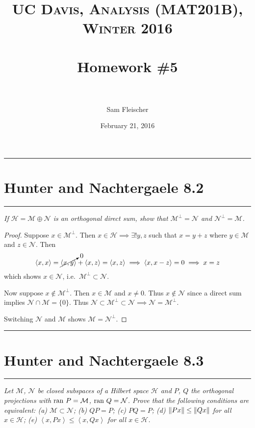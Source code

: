 \documentclass{article} %
\title{ 
\normalfont \normalsize 
\textsc{UC Davis, Analysis (MAT201B), Winter 2016} \\ [25pt] %
\horrule{2pt} \\[0.4cm] %
\Huge Homework \#5 \\ %
\horrule{2pt} \\[0.5cm] %
}
\author{\huge Sam Fleischer} %
\date{February 21, 2016} %
\theoremstyle{plain}
\newcommand{\VEC}[2]{\left\langle #1, #2 \right\rangle}
\newcommand{\ran}{\text{\rm ran }}
\newcommand{\problem}[1]{
\vspace{.375cm}
\begin{minipage}{\textwidth}
    \begin{center}
        \noindent\rule{5cm}{1pt}
    \end{center}
    \section{\bf #1}
    \begin{center}
        \noindent\rule{5cm}{1pt}
    \end{center}
    \vspace{0.25cm}
\end{minipage}
}
\numberwithin{equation}{section} %
\numberwithin{figure}{section} %
\numberwithin{table}{section} %
\begin{document}
\thispagestyle{empty}

\maketitle %

\makeatletter
{}
\makeatother

\pagebreak

\problem{Hunter and Nachtergaele 8.2}
\emph{If $\mathcal{H} = \mathcal{M} \oplus \mathcal{N}$ is an orthogonal direct sum, show that $\mathcal{M}^\perp = \mathcal{N}$ and $\mathcal{N}^\perp = \mathcal{M}$.}

\begin{proof}
    Suppose $x \in \mathcal{M}^\perp$.  Then $x \in \mathcal{H} \implies \exists!y, z$ such that $x = y + z$ where $y \in \mathcal{M}$ and $z \in \mathcal{N}$.  Then
    \begin{align*}
        \VEC{x}{x} = \cancelto{0}{\VEC{x}{y}} + \VEC{x}{z} = \VEC{x}{z} \implies \VEC{x}{x-z} = 0 \implies x = z
    \end{align*}
    which shows $x \in \mathcal{N}$, i.e.~$\mathcal{M}^\perp \subset \mathcal{N}$.

    Now suppose $x \not\in \mathcal{M}^\perp$.  Then $x \in \mathcal{M}$ and $x \neq 0$.  Thus $x \not\in \mathcal{N}$ since a direct sum implies $\mathcal{N} \cap \mathcal{M} = \{0\}$.  Thus $\mathcal{N} \subset \mathcal{M}^\perp \subset \mathcal{N} \implies \mathcal{N} = \mathcal{M}^\perp$.

    Switching $\mathcal{N}$ and $\mathcal{M}$ shows $\mathcal{M} = \mathcal{N}^\perp$.
\end{proof}









\problem{Hunter and Nachtergaele 8.3}
\emph{Let $\mathcal{M}$, $\mathcal{N}$ be closed subspaces of a Hilbert space $\mathcal{H}$ and $P$, $Q$ the orthogonal projections with $\ran P = \mathcal{M}$, $\ran Q = \mathcal{N}$.  Prove that the following conditions are equivalent: (a) $\mathcal{M} \subset \mathcal{N}$; (b) $QP = P$; (c) $PQ = P$; (d) $\norm{Px} \leq \norm{Qx}$ for all $x \in \mathcal{H}$; (e) $\VEC{x}{Px} \leq \VEC{x}{Qx}$ for all $x \in \mathcal{H}$.}
\end{document}
